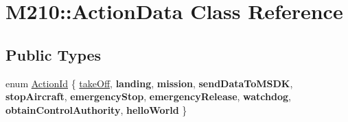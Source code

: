 \hypertarget{class_m210_1_1_action_data}{}\section{M210\+:\+:Action\+Data Class Reference}
\label{class_m210_1_1_action_data}
\subsection*{Public Types}
\begin{DoxyCompactItemize}
\item 
enum \mbox{\hyperlink{class_m210_1_1_action_data_a35cd47f396d015ad523e845ddfaeab4c}{Action\+Id}} \{ \newline
\mbox{\hyperlink{class_m210_1_1_action_data_a35cd47f396d015ad523e845ddfaeab4ca2db55758ab72814e1383f5930fe6634a}{take\+Off}}, 
{\bfseries landing}, 
{\bfseries mission}, 
{\bfseries send\+Data\+To\+M\+S\+DK}, 
\newline
{\bfseries stop\+Aircraft}, 
{\bfseries emergency\+Stop}, 
{\bfseries emergency\+Release}, 
{\bfseries watchdog}, 
\newline
{\bfseries obtain\+Control\+Authority}, 
{\bfseries hello\+World}
 \}
\end{DoxyCompactItemize}
